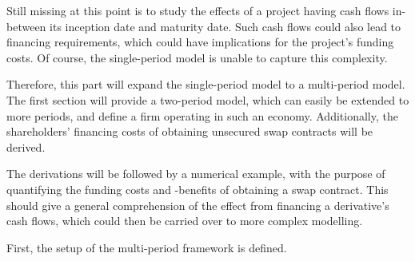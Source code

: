 \documentclass[main.tex]{subfiles}
\begin{document}
    Still missing at this point is to study the effects of a project
    having cash flows in-between its inception date and maturity date.
    Such cash flows could also lead to financing requirements,
    which could have implications for the project's funding costs.
    Of course, the single-period model is unable to capture this complexity.

    Therefore, this part will expand the single-period model to a multi-period model.
    The first section will provide a two-period model, 
    which can easily be extended to more periods,
    and define a firm operating in such an economy.
    Additionally, the shareholders' financing costs 
    of obtaining unsecured swap contracts will be derived.

    The derivations will be followed by a numerical example,
    with the purpose of quantifying the funding costs and -benefits of obtaining a swap contract.
    This should give a general comprehension of the effect from financing a derivative's cash flows,
    which could then be carried over to more complex modelling.

    First, the setup of the multi-period framework is defined.
\end{document}
